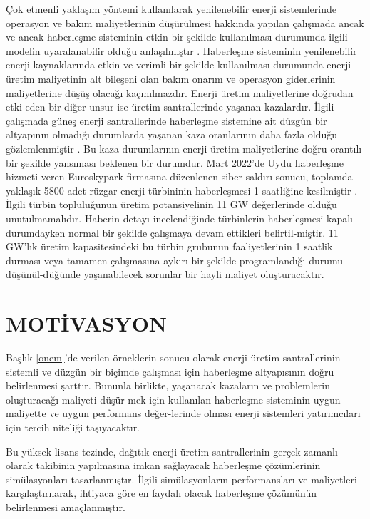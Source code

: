 Çok etmenli yaklaşım yöntemi kullanılarak yenilenebilir enerji sistemlerinde operasyon ve bakım maliyetlerinin düşürülmesi hakkında yapılan çalışmada ancak ve ancak haberleşme sisteminin etkin bir şekilde kullanılması durumunda ilgili modelin uyaralanabilir olduğu anlaşılmıştır \cite{7804974}. 
Haberleşme sisteminin yenilenebilir enerji kaynaklarında etkin ve verimli bir şekilde kullanılması durumunda enerji üretim maliyetinin alt bileşeni olan bakım onarım ve operasyon giderlerinin maliyetlerine düşüş olacağı kaçınılmazdır.
Enerji üretim maliyetlerine doğrudan etki eden bir diğer unsur ise üretim santrallerinde yaşanan kazalardır. İlgili çalışmada güneş enerji santrallerinde haberleşme sistemine ait düzgün bir altyapının olmadığı durumlarda yaşanan kaza oranlarının daha fazla olduğu gözlemlenmiştir \cite{https://doi.org/10.1002/dac.4517}. Bu kaza durumlarının enerji üretim maliyetlerine doğru orantılı bir şekilde yansıması beklenen bir durumdur.
Mart 2022'de Uydu haberleşme hizmeti veren Euroskypark firmasına düzenlenen siber saldırı sonucu, toplamda yaklaşık 5800 adet rüzgar enerji türbininin haberleşmesi 1 saatliğine kesilmiştir \cite{sibersaldiri}. İlgili türbin topluluğunun üretim potansiyelinin 11 GW değerlerinde olduğu unutulmamalıdır. Haberin detayı incelendiğinde türbinlerin haberleşmesi kapalı durumdayken normal bir şekilde çalışmaya devam ettikleri belirtil-miştir. 11 GW'lık üretim kapasitesindeki bu türbin grubunun faaliyetlerinin 1 saatlik durması veya tamamen çalışmasına aykırı bir şekilde programlandığı durumu düşünül-düğünde yaşanabilecek sorunlar bir hayli maliyet oluşturacaktır.




\section{MOTİVASYON} \label{motivasyon}



Başlık \ref{onem}'de verilen örneklerin sonucu olarak enerji üretim santrallerinin sistemli ve düzgün bir biçimde çalışması için haberleşme altyapısının doğru belirlenmesi şarttır. Bununla birlikte, yaşanacak kazaların ve problemlerin oluşturacağı maliyeti düşür-mek için kullanılan haberleşme sisteminin uygun maliyette ve uygun performans değer-lerinde olması enerji sistemleri yatırımcıları için tercih niteliği taşıyacaktır.

Bu yüksek lisans tezinde, dağıtık enerji üretim santrallerinin gerçek zamanlı olarak takibinin yapılmasına imkan sağlayacak haberleşme çözümlerinin simülasyonları tasarlanmıştır. İlgili simülasyonların performansları ve maliyetleri karşılaştırılarak, ihtiyaca göre en faydalı olacak haberleşme çözümünün belirlenmesi amaçlanmıştır.


